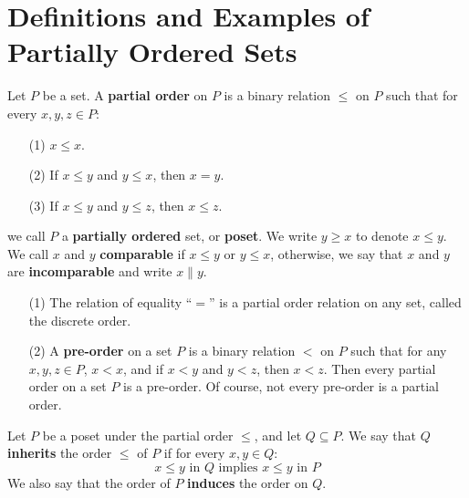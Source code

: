 \section{Definitions and Examples of Partially Ordered Sets}
\label{section_1.1}

\begin{definition}
  Let $P$ be a set. A \textbf{partial order} on $P$ is a binary
  relation $\leq$ on $P$ such that for every  $x,y, z \in P$:
  \begin{enumerate}
    \item[(1)] $x \leq x$.

    \item[(2)] If $x \leq y$ and $y \leq x$, then $x=y$.

    \item[(3)] If $x \leq y$ and $y \leq z$, then $x \leq z$.
  \end{enumerate}
  we call $P$ a \textbf{partially ordered} set, or \textbf{poset}. We
  write $y \geq x$ to denote $x \leq y$. We call  $x$ and $y$
  \textbf{comparable} if $x \leq y$ or $y \leq x$, otherwise, we say
  that $x$ and $y$ are \textbf{incomparable} and write $x \| y$.
\end{definition}

\begin{example}\label{example_1.1}
  \begin{enumerate}
    \item[(1)] The relation of equality ``$=$'' is a partial order
      relation on any set, called the discrete order.

    \item[(2)] A \textbf{pre-order} on a set $P$ is a binary relation
       $<$ on $P$ such that for any $x,y, z \in P$, $x < x$, and if
       $x < y$ and $y < z$, then $x < z$. Then every partial order on
       a set $P$ is a pre-order. Of course, not every pre-order is a
       partial order.
  \end{enumerate}
\end{example}

\begin{definition}
  Let $P$ be a poset under the partial order $\leq$, and let $Q
  \subseteq P$. We say that $Q$ \textbf{inherits} the order $\leq$ of
   $P$ if for every $x,y \in Q$:
   \begin{equation*}
     x \leq y \text{ in } Q \text{ implies } x \leq y \text{ in } P
   \end{equation*}
   We also say that the order of $P$  \textbf{induces} the order on
   $Q$.
\end{definition}

